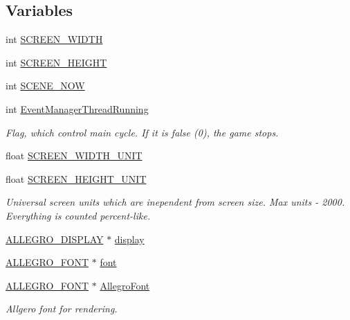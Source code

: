\subsection*{Variables}
\begin{DoxyCompactItemize}
\item 
int \hyperlink{group___library_merger_ga599adbe412c60e0cc5abb86be7ee4507}{S\+C\+R\+E\+E\+N\+\_\+\+W\+I\+D\+TH}
\item 
int \hyperlink{group___library_merger_gaf1c710caf1e3a9e81829078054e83799}{S\+C\+R\+E\+E\+N\+\_\+\+H\+E\+I\+G\+HT}
\item 
int \hyperlink{group___library_merger_ga869b5af4da79e3acdab70d05679093c7}{S\+C\+E\+N\+E\+\_\+\+N\+OW}
\item 
int \hyperlink{group___library_merger_ga1318fa5effb70983960c09c162701742}{Event\+Manager\+Thread\+Running}
\begin{DoxyCompactList}\small\item\em Flag, which control main cycle. If it is false (0), the game stops. \end{DoxyCompactList}\item 
float \hyperlink{group___library_merger_ga8425d17a7c34516b1047f12c3b0e3d17}{S\+C\+R\+E\+E\+N\+\_\+\+W\+I\+D\+T\+H\+\_\+\+U\+N\+IT}
\item 
float \hyperlink{group___library_merger_gac4c0057b3db1dab613cee945f3e0c8cd}{S\+C\+R\+E\+E\+N\+\_\+\+H\+E\+I\+G\+H\+T\+\_\+\+U\+N\+IT}
\begin{DoxyCompactList}\small\item\em Universal screen units which are inependent from screen size. Max units -\/ 2000. Everything is counted percent-\/like. \end{DoxyCompactList}\item 
\hyperlink{display_8h_a7516185aa39c086f4bc62bd4bf5858bf}{A\+L\+L\+E\+G\+R\+O\+\_\+\+D\+I\+S\+P\+L\+AY} $\ast$ \hyperlink{group___library_merger_gaf64cc6c8a47e5ddbf510b5aa92e062b9}{display}
\item 
\hyperlink{allegro__font_8h_af3fe7d773389432eb23c336db0c1d8bb}{A\+L\+L\+E\+G\+R\+O\+\_\+\+F\+O\+NT} $\ast$ \hyperlink{group___library_merger_gae4254615de94af5fc74d43e8b676dcf9}{font}
\item 
\hyperlink{allegro__font_8h_af3fe7d773389432eb23c336db0c1d8bb}{A\+L\+L\+E\+G\+R\+O\+\_\+\+F\+O\+NT} $\ast$ \hyperlink{group___library_merger_ga18d30843d40a57148bbfacc9cf1ef055}{Allegro\+Font}
\begin{DoxyCompactList}\small\item\em Allgero font for rendering. \end{DoxyCompactList}\item 

\end{DoxyCompactItemize}
